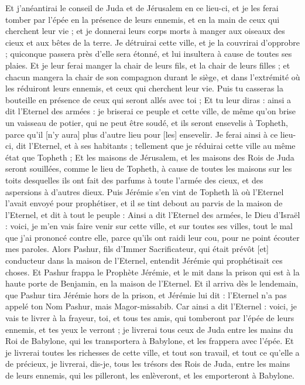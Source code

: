 \begin{multicols}{2}
Et j'anéantirai le conseil de Juda et de Jérusalem en ce lieu-ci, et je les ferai tomber par l'épée en la présence de leurs ennemis, et en la main de ceux qui cherchent leur vie ; et je donnerai leurs corps morts à manger aux oiseaux des cieux et aux bêtes de la terre.
Je détruirai cette ville, et je la couvrirai d'opprobre ; quiconque passera près d'elle sera étonné, et lui insultera à cause de toutes ses plaies.
Et je leur ferai manger la chair de leurs fils, et la chair de leurs filles ; et chacun mangera la chair de son compagnon durant le siège, et dans l'extrémité où les réduiront leurs ennemis, et ceux qui cherchent leur vie.
Puis tu casseras la bouteille en présence de ceux qui seront allés avec toi ;
Et tu leur diras : ainsi a dit l'Eternel des armées : je briserai ce peuple et cette ville, de même qu'on brise un vaisseau de potier, qui ne peut être soudé, et ils seront ensevelis à Topheth, parce qu'il [n'y aura] plus d'autre lieu pour [les] ensevelir.
Je ferai ainsi à ce lieu-ci, dit l'Eternel, et à ses habitants ; tellement que je réduirai cette ville au même état que Topheth ;
Et les maisons de Jérusalem, et les maisons des Rois de Juda seront souillées, comme le lieu de Topheth, à cause de toutes les maisons sur les toits desquelles ils ont fait des parfums à toute l'armée des cieux, et des aspersions à d'autres dieux.
Puis Jérémie s'en vint de Topheth là où l'Eternel l'avait envoyé pour prophétiser, et il se tint debout au parvis de la maison de l'Eternel, et dit à tout le peuple :
Ainsi a dit l'Eternel des armées, le Dieu d'Israël : voici, je m'en vais faire venir sur cette ville, et sur toutes ses villes, tout le mal que j'ai prononcé contre elle, parce qu'ils ont raidi leur cou, pour ne point écouter mes paroles.
\VerseOne{}Alors Pashur, fils d'Immer Sacrificateur, qui était prévôt [et] conducteur dans la maison de l'Eternel, entendit Jérémie qui prophétisait ces choses.
Et Pashur frappa le Prophète Jérémie, et le mit dans la prison qui est à la haute porte de Benjamin, en la maison de l'Eternel.
Et il arriva dès le lendemain, que Pashur tira Jérémie hors de la prison, et Jérémie lui dit : l'Eternel n'a pas appelé ton Nom Pashur, mais Magor-missabib.
Car ainsi a dit l'Eternel : voici, je vais te livrer à la frayeur, toi, et tous tes amis, qui tomberont par l'épée de leurs ennemis, et tes yeux le verront ; je livrerai tous ceux de Juda entre les mains du Roi de Babylone, qui les transportera à Babylone, et les frappera avec l'épée.
Et je livrerai toutes les richesses de cette ville, et tout son travail, et tout ce qu'elle a de précieux, je livrerai, dis-je, tous les trésors des Rois de Juda, entre les mains de leurs ennemis, qui les pilleront, les enlèveront, et les emporteront à Babylone.

\end{multicols}

